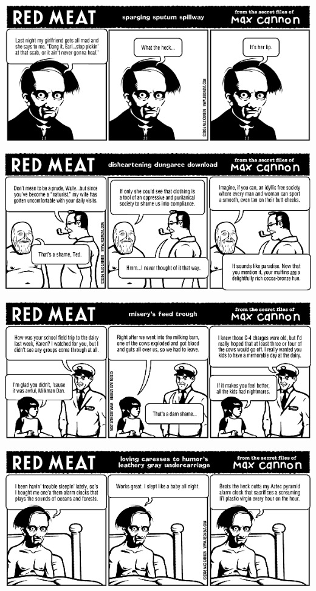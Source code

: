 \documentclass[a4paper,twoside,11pt]{article}
\begin{document}
\includegraphics[width=\textwidth]{redmeat_2006-01-17.png}



\includegraphics[width=\textwidth]{redmeat_2006-01-24.png}



\includegraphics[width=\textwidth]{redmeat_2006-01-31.png}



\includegraphics[width=\textwidth]{redmeat_2006-02-07.png}
\end{document}
